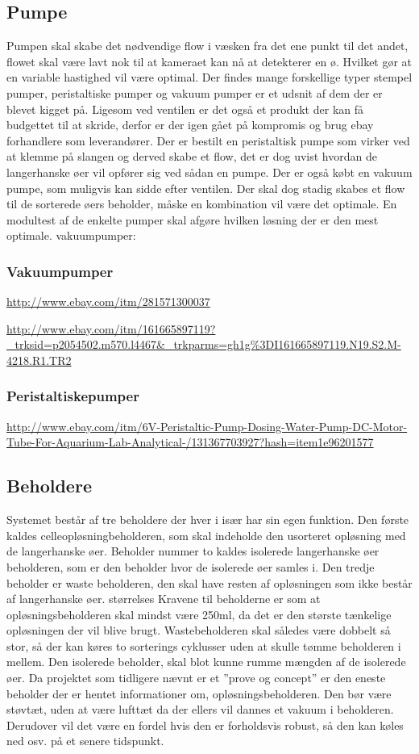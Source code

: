 \subsection{Pumpe}
Pumpen skal skabe det nødvendige flow i væsken fra det ene punkt til det andet, flowet skal være lavt nok til at kameraet kan nå at detekterer en ø. Hvilket gør at en variable hastighed vil være optimal. Der findes mange forskellige typer stempel pumper, peristaltiske pumper og vakuum pumper er et udsnit af dem der er blevet kigget på. Ligesom ved ventilen er det også et produkt der kan få budgettet til at skride, derfor er der igen gået på kompromis og brug ebay forhandlere som leverandører. Der er bestilt en peristaltisk pumpe som virker ved at klemme på slangen og derved skabe et flow, det er dog uvist hvordan de langerhanske øer vil opfører sig ved sådan en pumpe. Der er også købt en vakuum pumpe, som muligvis kan sidde efter ventilen. Der skal dog stadig skabes et flow til de sorterede øers beholder, måske en kombination vil være det optimale. En modultest af de enkelte pumper skal afgøre hvilken løsning der er den mest optimale. 
vakuumpumper:
\subsubsection{Vakuumpumper}
\url{ http://www.ebay.com/itm/281571300037}

\url{http://www.ebay.com/itm/161665897119?_trksid=p2054502.m570.l4467&_trkparms=gh1g%3DI161665897119.N19.S2.M-4218.R1.TR2}

\subsubsection{Peristaltiskepumper}

\url{http://www.ebay.com/itm/6V-Peristaltic-Pump-Dosing-Water-Pump-DC-Motor-Tube-For-Aquarium-Lab-Analytical-/131367703927?hash=item1e96201577}

\subsection{Beholdere}
Systemet består af tre beholdere der hver i især har sin egen funktion. Den første kaldes celleopløsningbeholderen, som skal indeholde den usorteret opløsning med de langerhanske øer. Beholder nummer to kaldes isolerede langerhanske øer beholderen, som er den beholder hvor de isolerede øer samles i. Den tredje beholder er waste beholderen, den skal have resten af opløsningen som ikke består af langerhanske øer. størrelses Kravene til beholderne er som at opløsningsbeholderen skal mindst være 250ml, da det er den største tænkelige opløsningen der vil blive brugt. Wastebeholderen skal således være dobbelt så stor, så der kan køres to sorterings cyklusser uden at skulle tømme beholderen i mellem. Den isolerede beholder, skal blot kunne rumme mængden af de isolerede øer. Da projektet som tidligere nævnt er et ”prove og concept” er den eneste beholder der er hentet informationer om, opløsningsbeholderen. Den bør være støvtæt, uden at være lufttæt da der ellers vil dannes et vakuum i beholderen. Derudover vil det være en fordel hvis den er forholdsvis robust, så den kan køles ned osv. på et senere tidspunkt.


